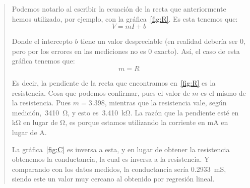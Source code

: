 \documentclass{article}
\begin{document}
\begin{enumerate}[label=\alph*.-]
\begin{quote}
            Podemos notarlo al escribir la ecuación de la recta que anteriormente hemos utilizado, por ejemplo, con la gráfica~\ref{fig:R}. Es esta tenemos que:
            \[
                V = mI + b
            \] 

            Donde el intercepto $b$ tiene un valor despreciable (en realidad debería ser $0$, pero por los errores en las mediciones no es $0$ exacto). Así, el caso de esta gráfica tenemos que:
            \[
                m = R
            \]

            Es decir, la pendiente de la recta que encontramos en~\ref{fig:R} es la resistencia. Cosa que podemos confirmar, pues el valor de $m$ es el mismo de la resistencia. Pues $m = 3.398$, mientras que la resistencia vale, según medición,~\SI{3410}{\ohm}, y esto es~\SI{3.410}{\kilo\ohm}. La razón que la pendiente esté en \unit{\kilo\ohm} en lugar de \unit{\ohm}, es porque estamos utilizando la corriente en \unit{\milli\ampere} en lugar de \unit{\ampere}.

            La gráfica~\ref{fig:C} es inversa a esta, y en lugar de obtener la resistencia obtenemos la conductancia, la cual es inversa a la resistencia. Y comparando con los datos medidos, la conductancia sería \SI{0.2933}{\milli\siemens}, siendo este un valor muy cercano al obtenido por regresión lineal.
        \end{quote}

    \end{enumerate}
\end{document}
